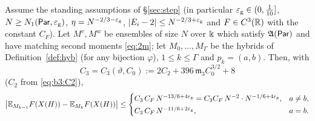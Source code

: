 \begin{proposition}\label{prop:step}
Assume the standing assumptions of \S\ref{sec:step} \textup{(}in particular $\varepsilon_{\mathrm g}\in(0,\frac1{10}]$, $N\ge N_1(\mathsf{Par},\varepsilon_{\mathrm g})$, $\eta=N^{-2/3-\varepsilon_{\mathrm g}}$, $|E_i-2|\le N^{-2/3+\varepsilon_{\mathrm g}}$ and $F\in C^3(\mathbb{R})$ with the constant $C_F$\textup{)}.
Let $M^v,M^w$ be ensembles of size $N$ over $\Bbbk$ which satisfy $\mathfrak{A}(\mathsf{Par})$ and have matching second moments \eqref{eq:2m}; let $M_0,\dots,M_\Gamma$ be the hybrids of Definition~\ref{def:hyb}
(for any bijection $\varphi$), $1\le k\le\Gamma$ and $p_k=(a,b)$. Then, with
\begin{equation}\label{eq:b3:C3}
C_3=C_3(\vartheta,C_0):=2C_2+396\,\mathfrak m_3C_0^{3/2}+8
\end{equation}
\textup{(}$C_2$ from \eqref{eq:b3:C2}\textup{)},
\[
\big|\mathbb{E}_{M_{k-1}}F(X(H))-\mathbb{E}_{M_k}F(X(H))\big|\le\begin{cases}C_3\,C_F\,N^{-13/6+4\varepsilon_{\mathrm g}}=C_3C_F\,N^{-2}\cdot N^{-1/6+4\varepsilon_{\mathrm g}},&a\ne b,\\[2pt] C_3\,C_F\,N^{-11/6+2\varepsilon_{\mathrm g}},&a=b.\end{cases}
\]
\end{proposition}
